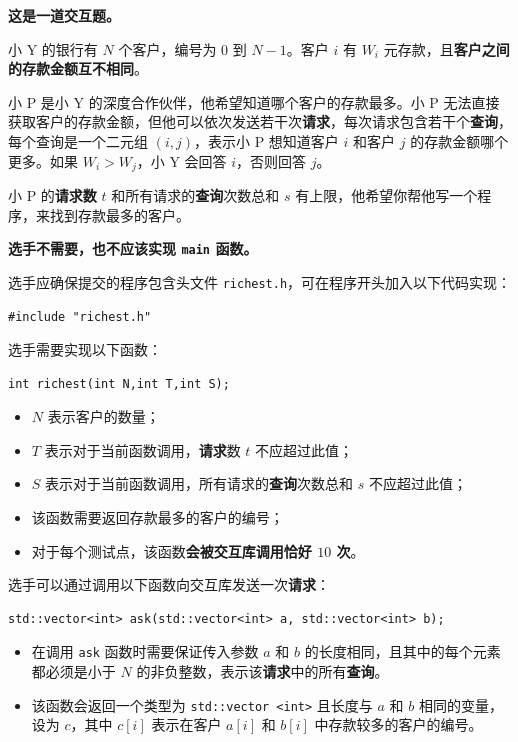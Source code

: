 \documentclass{oicontest-v2}
\begin{document}
\oicnextproblem %

\textbf{这是一道交互题。}\vspace{-1em}

\oicstatement

小 Y 的银行有 $N$ 个客户，编号为 $0$ 到 $N-1$。客户 $i$ 有 $W_i$ 元存款，且\textbf{客户之间的存款金额互不相同}。

小 P 是小 Y 的深度合作伙伴，他希望知道哪个客户的存款最多。小 P 无法直接获取客户的存款金额，但他可以依次发送若干次\textbf{请求}，每次请求包含若干个\textbf{查询}，每个查询是一个二元组 $(i,j)$，表示小 P 想知道客户 $i$ 和客户 $j$ 的存款金额哪个更多。如果 $W_i>W_j$，小 Y 会回答 $i$，否则回答 $j$。

小 P 的\textbf{请求数} $t$ 和所有请求的\textbf{查询}次数总和 $s$ 有上限，他希望你帮他写一个程序，来找到存款最多的客户。

\oicimplementation

\textbf{选手不需要，也不应该实现 \texttt{main} 函数。}

选手应确保提交的程序包含头文件 \texttt{richest.h}，可在程序开头加入以下代码实现：

\begin{verbatim}
#include "richest.h"
\end{verbatim}

选手需要实现以下函数：

\begin{verbatim}
int richest(int N,int T,int S);
\end{verbatim}

\begin{itemize}
	\item  $N$ 表示客户的数量；
	\item $T$ 表示对于当前函数调用，\textbf{请求}数 $t$ 不应超过此值；
	\item $S$ 表示对于当前函数调用，所有请求的\textbf{查询}次数总和 $s$ 不应超过此值；
	\item 该函数需要返回存款最多的客户的编号；
	\item 对于每个测试点，该函数\textbf{会被交互库调用恰好 $10$ 次}。
\end{itemize}

选手可以通过调用以下函数向交互库发送一次\textbf{请求}：

\begin{verbatim}
std::vector<int> ask(std::vector<int> a, std::vector<int> b);
\end{verbatim}

\begin{itemize}
	\item 在调用 \texttt{ask} 函数时需要保证传入参数 $a$ 和 $b$ 的长度相同，且其中的每个元素都必须是小于 $N$ 的非负整数，表示该\textbf{请求}中的所有\textbf{查询}。
	\item 该函数会返回一个类型为 \texttt{std::vector <int>} 且长度与 $a$ 和 $b$ 相同的变量，设为 $c$，其中 $c[i]$ 表示在客户 $a[i]$ 和 $b[i]$ 中存款较多的客户的编号。
\end{itemize}
\end{document}
